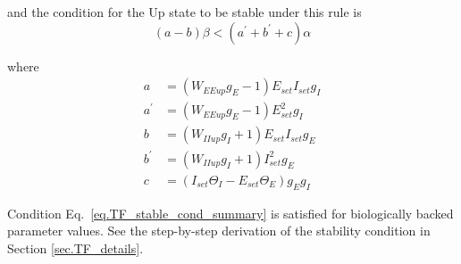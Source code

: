 \documentclass[
twocolumn,
]{article}
\newcommand{\EE}{\mathit{EE}}
\newcommand{\EI}{\mathit{EI}}
\newcommand{\IE}{\mathit{IE}}
\newcommand{\II}{\mathit{II}}
\newcommand{\set}{\mathit{set}}
\newcommand{\up}{\mathit{up}}
\begin{document}
\noindent and the condition for the Up state to be stable under this rule is
\begin{equation}
(a - b)\beta < (a^\prime + b^\prime + c) \alpha
\label{eq.TF_stable_cond_summary}
\end{equation}

\noindent where
\begin{displaymath}
\begin{aligned}
a & = (W_{\EE\up}g_E - 1) E_{\set} I_{\set} g_I \\
a^\prime & = (W_{\EE\up}g_E - 1)E_{\set}^2 g_I \\
b & = (W_{\II\up}g_I + 1) E_{\set} I_{\set} g_E \\
b^\prime & = (W_{\II\up}g_I + 1)I_{\set}^2 g_E \\
c & = (I_{\set}\Theta_I - E_{\set}\Theta_E)g_E g_I
\end{aligned}
\end{displaymath}

\noindent Condition Eq.\ \ref{eq.TF_stable_cond_summary} is satisfied for biologically backed parameter values. See the step-by-step derivation of the stability condition in Section \ref{sec.TF_details}.




\end{document}

